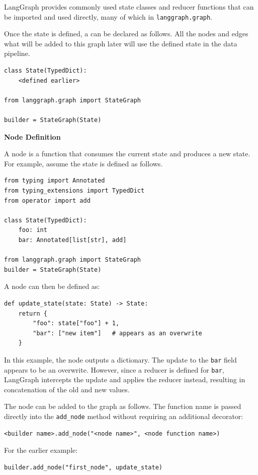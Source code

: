 LangGraph provides commonly used state classes and reducer functions that can be imported and used directly, many of which in \texttt{langgraph.graph}.

Once the state is defined, a  can be declared as follows. All the nodes and edges what will be added to this graph later will use the defined state in the data pipeline.
\begin{lstlisting}
class State(TypedDict):
    <defined earlier>

from langgraph.graph import StateGraph

builder = StateGraph(State)
\end{lstlisting}

\vspace{0.1in}
\noindent \textbf{Node Definition}
\vspace{0.1in}

A node is a function that consumes the current state and produces a new state. For example, assume the state is defined as follows.
\begin{lstlisting}
from typing import Annotated
from typing_extensions import TypedDict
from operator import add

class State(TypedDict):
    foo: int
    bar: Annotated[list[str], add]

from langgraph.graph import StateGraph
builder = StateGraph(State)
\end{lstlisting}

A node can then be defined as:
\begin{lstlisting}
def update_state(state: State) -> State:
    return {
        "foo": state["foo"] + 1,
        "bar": ["new item"]   # appears as an overwrite
    }
\end{lstlisting}
In this example, the node outputs a dictionary. The update to the \texttt{bar} field appears to be an overwrite. However, since a reducer is defined for \texttt{bar}, LangGraph intercepts the update and applies the reducer instead, resulting in concatenation of the old and new values.

The node can be added to the graph as follows. The function name is passed directly into the \verb|add_node| method without requiring an additional decorator:
\begin{lstlisting}
<builder name>.add_node("<node name>", <node function name>)
\end{lstlisting}
For the earlier example:
\begin{lstlisting}
builder.add_node("first_node", update_state)
\end{lstlisting}

